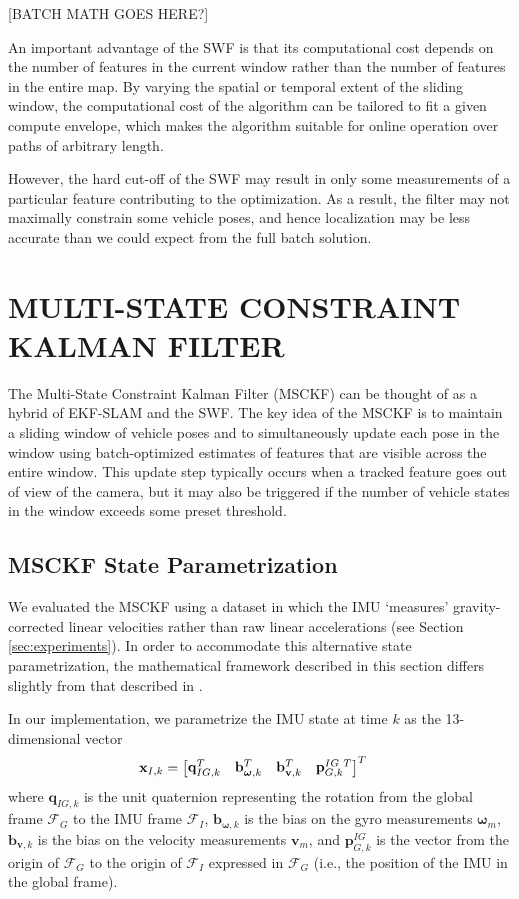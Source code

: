 \documentclass[letterpaper, 10 pt, conference]{ieeeconf}  %
\def\Vec#1{\mathbf{#1}}
\newcommand{\bbm}{\begin{bmatrix}}
\newcommand{\ebm}{\end{bmatrix}}
\begin{document}
[BATCH MATH GOES HERE?]

An important advantage of the SWF is that its computational cost depends on the number of features in the current window rather than the number of features in the entire map.
By varying the spatial or temporal extent of the sliding window, the computational cost of the algorithm can be tailored to fit a given compute envelope, which makes the algorithm suitable for online operation over paths of arbitrary length.

However, the hard cut-off of the SWF may result in only some measurements of a particular feature contributing to the optimization.
As a result, the filter may not maximally constrain some vehicle poses, and hence localization may be less accurate than we could expect from the full batch solution.

\section{MULTI-STATE CONSTRAINT KALMAN FILTER} \label{sec:msckf}
The Multi-State Constraint Kalman Filter (MSCKF) \cite{Mourikis:2007:ICRA} can be thought of as a hybrid of EKF-SLAM and the SWF.
The key idea of the MSCKF is to maintain a sliding window of vehicle poses and to simultaneously update each pose in the window using batch-optimized estimates of features that are visible across the entire window.
This update step typically occurs when a tracked feature goes out of view of the camera, but it may also be triggered if the number of vehicle states in the window exceeds some preset threshold.

\subsection{MSCKF State Parametrization}
We evaluated the MSCKF using a dataset in which the IMU `measures' gravity-corrected linear velocities rather than raw linear accelerations (see Section \ref{sec:experiments}).
In order to accommodate this alternative state parametrization, the mathematical framework described in this section differs slightly from that described in \cite{Mourikis:2007:ICRA}.

In our implementation, we parametrize the IMU state at time $k$ as the 13-dimensional vector
\begin{align}
    \Vec{x}_{I,k} &= \bbm \Vec{q}_{IG,k}^T & \Vec{b}_{\boldsymbol{\omega},k}^T & \Vec{b}_{\Vec{v},k}^T & \Vec{p}_{G,k}^{IG \hspace{0.3em} T} \ebm^T
\end{align}
where $\Vec{q}_{IG,k}$ is the unit quaternion representing the rotation from the global frame $\mathcal{F}_G$ to the IMU frame $\mathcal{F}_I$, $\Vec{b}_{\boldsymbol{\omega},k}$ is the bias on the gyro measurements $\boldsymbol{\omega}_m$, $\Vec{b}_{\Vec{v},k}$ is the bias on the velocity measurements $\Vec{v}_m$, and $\Vec{p}_{G,k}^{IG}$ is the vector from the origin of $\mathcal{F}_G$ to the origin of $\mathcal{F}_I$ expressed in $\mathcal{F}_G$ (i.e., the position of the IMU in the global frame).
\end{document}
